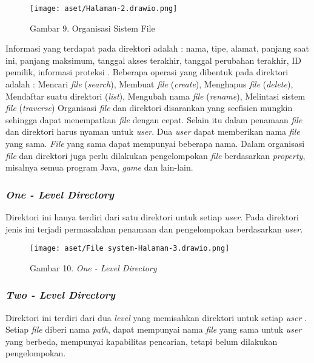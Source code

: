 \documentclass[12pt]{article}
\begin{document}
\begin{itemize}
		\begin{figure}[h!]
			\centering
			\texttt{[image: aset/Halaman-2.drawio.png]}
			\captionsetup{labelformat=empty}
			\caption{Gambar 9. Organisasi Sistem File}
		\end{figure}
		
		Informasi yang terdapat pada direktori adalah :  nama, tipe, alamat, panjang saat ini,  panjang maksimum, tanggal akses terakhir, tanggal perubahan terakhir, ID pemilik, informasi proteksi . Beberapa operasi yang dibentuk pada direktori adalah : Mencari \textit{file} (\textit{search}),  Membuat \textit{file} (\textit{create}), Menghapus \textit{file} (\textit{delete}), Mendaftar suatu direktori (\textit{list}), Mengubah nama \textit{file} (\textit{r\textit{ename}}),  Melintasi sistem \textit{file }(\textit{traverse})   
		Organisasi \textit{file} dan direktori disarankan yang seefisien mungkin sehingga dapat menempatkan \textit{file} dengan cepat. Selain itu dalam penamaan \textit{file} dan direktori harus nyaman untuk\textit{ user}. Dua \textit{user} dapat memberikan nama \textit{file} yang sama. \textit{File} yang sama dapat mempunyai beberapa nama. Dalam organisasi \textit{file} dan direktori juga perlu dilakukan pengelompokan \textit{file }berdasarkan \textit{property}, misalnya semua program Java, \textit{game} dan lain-lain. 
		
		\subsubsection{\textit{One - Level Directory}}
		Direktori ini hanya terdiri dari satu direktori untuk setiap\textit{ user}. Pada direktori jenis ini terjadi permasalahan penamaan dan pengelompokan berdasarkan \textit{user.} 
		\begin{figure}[h!]
			\centering
			\texttt{[image: aset/File system-Halaman-3.drawio.png]}
			\captionsetup{labelformat=empty}
			\caption{Gambar 10.\textit{ One - Level Directory}}
		\end{figure}
		
		\subsubsection{\textit{Two - Level Directory}}
		Direktori ini terdiri dari dua \textit{level} yang memisahkan direktori untuk setiap \textit{user} . Setiap \textit{file} diberi nama \textit{path}, dapat mempunyai nama \textit{file} yang sama untuk \textit{user} yang berbeda, mempunyai kapabilitas pencarian, tetapi belum dilakukan pengelompokan. 
		

\end{itemize}
\end{document}
